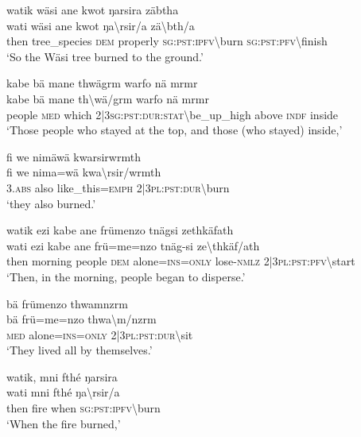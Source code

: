\ea\label{ex:1:a3511}
watik wäsi ane kwot ŋarsira zäbtha\\
\gll wati	wäsi	ane	kwot	ŋa{\textbackslash}rsir/a	zä{\textbackslash}bth/a\\
     then	tree\_species	\textsc{dem}	properly	\textsc{sg}:\textsc{pst}:\textsc{ipfv}{\textbackslash}burn	\textsc{sg}:\textsc{pst}:\textsc{pfv}{\textbackslash}finish\\
\glt `So the Wäsi tree burned to the ground.'
\z

\ea\label{ex:1:a3513}
kabe bä mane thwägrm warfo nä mrmr\\
\gll kabe	bä	mane	th{\textbackslash}wä/grm	warfo	nä	mrmr\\
     people	\textsc{med}	which	2|3\textsc{sg}:\textsc{pst}:\textsc{dur}:\textsc{stat}{\textbackslash}be\_up\_high	above	\textsc{indf}	inside\\
\glt `Those people who stayed at the top, and those (who stayed) inside,'
\z

\ea\label{ex:1:a3515}
fi we nimäwä kwarsirwrmth\\
\gll fi	we	nima=wä	kwa{\textbackslash}rsir/wrmth\\
     3.\textsc{abs}	also	like\_this=\textsc{emph}	2|3\textsc{pl}:\textsc{pst}:\textsc{dur}{\textbackslash}burn\\
\glt `they also burned.'
\z

\ea\label{ex:1:a3516}
watik ezi kabe ane frümenzo tnägsi zethkäfath\\
\gll wati	ezi	kabe	ane	frü=me=nzo	tnäg-si	ze{\textbackslash}thkäf/ath\\
     then	morning	people	\textsc{dem}	alone=\textsc{ins}=\textsc{only}	lose-\textsc{nmlz}	2|3\textsc{pl}:\textsc{pst}:\textsc{pfv}{\textbackslash}start\\
\glt `Then, in the morning, people began to disperse.'
\z

\ea\label{ex:1:a3519}
bä frümenzo thwamnzrm\\
\gll bä	frü=me=nzo	thwa{\textbackslash}m/nzrm\\
     \textsc{med}	alone=\textsc{ins}=\textsc{only}	2|3\textsc{pl}:\textsc{pst}:\textsc{dur}{\textbackslash}sit\\
\glt `They lived all by themselves.'
\z

\ea\label{ex:1:a3520}
watik, mni fthé ŋarsira\\
\gll wati	mni	fthé	ŋa{\textbackslash}rsir/a\\
     then	fire	when	\textsc{sg}:\textsc{pst}:\textsc{ipfv}{\textbackslash}burn\\
\glt `When the fire burned,'
\z

